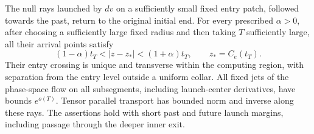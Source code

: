\begin{proposition}
\label{pk2:escape}
The null rays launched by $dv$ on a sufficiently small fixed entry
patch, followed towards the past, return to the original initial
end. For every prescribed $\alpha>0$, after choosing a sufficiently
large fixed radius and then taking $T$ sufficiently large, all their
arrival points satisfy
\begin{equation}
 (1-\alpha)t_T<|z-z_*|<(1+\alpha)t_T,
 \qquad z_*=C_e(t_T).
 \tag{E1}\label{pk2:arrival-shell}
\end{equation}
Their entry crossing is unique and transverse within the computing
region, with separation from the entry level outside a uniform
collar. All fixed jets of the phase-space flow on all subsegments,
including launch-center derivatives, have bounds $e^{o(T)}$.
Tensor parallel transport has bounded norm and inverse along these
rays. The assertions hold with short past and future launch margins,
including passage through the deeper inner exit.
\end{proposition}
